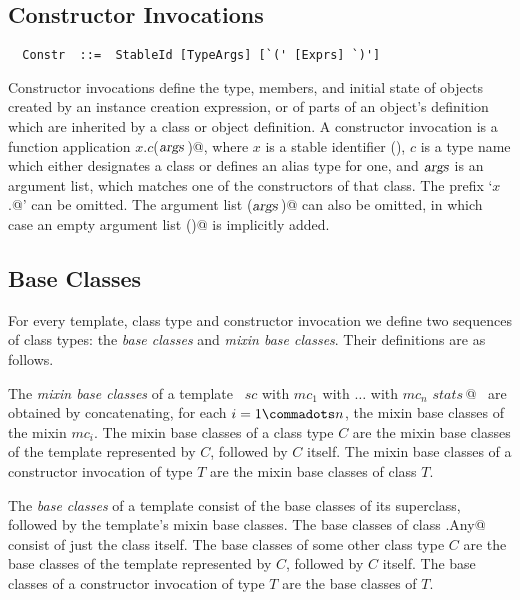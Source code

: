\documentclass[a4paper,12pt,twoside,titlepage]{book}
\newcommand{\args}{\mbox{\sl args}}
\begin{document}
\subsection{Constructor Invocations}
\label{sec:constr-invoke}
\syntax\begin{lstlisting}
  Constr  ::=  StableId [TypeArgs] [`(' [Exprs] `)']  
\end{lstlisting}

Constructor invocations define the type, members, and initial state of
objects created by an instance creation expression, or of parts of an
object's definition which are inherited by a class or object
definition. A constructor invocation is a function application
\lstinline@$x$.$c$($\args\,$)@, where $x$ is a stable identifier
(), $c$ is a type name which either
designates a class or defines an alias type for one, and $\args$
is an argument list, which matches one of the constructors of that
class. The prefix `\lstinline@$x$.@' can be omitted. 
The argument list \lstinline@($\args\,$)@ can also be omitted, in which case an
empty argument list \lstinline@()@ is implicitly added.

\subsection{Base Classes}
\label{sec:base-classes}

For every template, class type and constructor invocation we define two
sequences of class types: the {\em base classes} and {\em mixin base
classes}. Their definitions are as follows.

The {\em mixin base classes} of a template
~\lstinline@$sc$ with $mc_1$ with $\ldots$ with $mc_n$ {$stats\,$}@~ are obtained by
concatenating, for each $i = 1 \commadots n$, the mixin base classes
of the mixin $mc_i$. The mixin base classes of a class type $C$ are
the mixin base classes of the template represented by $C$, followed by
$C$ itself. The mixin base classes of a constructor invocation of type
$T$ are the mixin base classes of class $T$.

The {\em base classes} of a template consist of the base classes of
its superclass, followed by the template's mixin base classes.  The
base classes of class \lstinline@scala.Any@ consist of just the
class itself. The base classes of some other class type $C$ are the
base classes of the template represented by $C$, followed by $C$
itself.  The base classes of a constructor invocation of type $T$
are the base classes of $T$.
\end{document}
